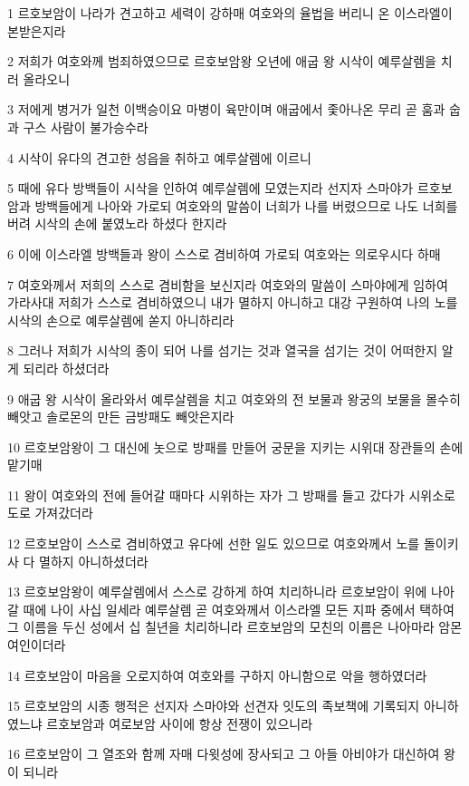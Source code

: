\par 1 르호보암이 나라가 견고하고 세력이 강하매 여호와의 율법을 버리니 온 이스라엘이 본받은지라
\par 2 저희가 여호와께 범죄하였으므로 르호보암왕 오년에 애굽 왕 시삭이 예루살렘을 치러 올라오니
\par 3 저에게 병거가 일천 이백승이요 마병이 육만이며 애굽에서 좇아나온 무리 곧 훔과 숩과 구스 사람이 불가승수라
\par 4 시삭이 유다의 견고한 성읍을 취하고 예루살렘에 이르니
\par 5 때에 유다 방백들이 시삭을 인하여 예루살렘에 모였는지라 선지자 스마야가 르호보암과 방백들에게 나아와 가로되 여호와의 말씀이 너희가 나를 버렸으므로 나도 너희를 버려 시삭의 손에 붙였노라 하셨다 한지라
\par 6 이에 이스라엘 방백들과 왕이 스스로 겸비하여 가로되 여호와는 의로우시다 하매
\par 7 여호와께서 저희의 스스로 겸비함을 보신지라 여호와의 말씀이 스마야에게 임하여 가라사대 저희가 스스로 겸비하였으니 내가 멸하지 아니하고 대강 구원하여 나의 노를 시삭의 손으로 예루살렘에 쏟지 아니하리라
\par 8 그러나 저희가 시삭의 종이 되어 나를 섬기는 것과 열국을 섬기는 것이 어떠한지 알게 되리라 하셨더라
\par 9 애굽 왕 시삭이 올라와서 예루살렘을 치고 여호와의 전 보물과 왕궁의 보물을 몰수히 빼앗고 솔로몬의 만든 금방패도 빼앗은지라
\par 10 르호보암왕이 그 대신에 놋으로 방패를 만들어 궁문을 지키는 시위대 장관들의 손에 맡기매
\par 11 왕이 여호와의 전에 들어갈 때마다 시위하는 자가 그 방패를 들고 갔다가 시위소로 도로 가져갔더라
\par 12 르호보암이 스스로 겸비하였고 유다에 선한 일도 있으므로 여호와께서 노를 돌이키사 다 멸하지 아니하셨더라
\par 13 르호보암왕이 예루살렘에서 스스로 강하게 하여 치리하니라 르호보암이 위에 나아갈 때에 나이 사십 일세라 예루살렘 곧 여호와께서 이스라엘 모든 지파 중에서 택하여 그 이름을 두신 성에서 십 칠년을 치리하니라 르호보암의 모친의 이름은 나아마라 암몬 여인이더라
\par 14 르호보암이 마음을 오로지하여 여호와를 구하지 아니함으로 악을 행하였더라
\par 15 르호보암의 시종 행적은 선지자 스마야와 선견자 잇도의 족보책에 기록되지 아니하였느냐 르호보암과 여로보암 사이에 항상 전쟁이 있으니라
\par 16 르호보암이 그 열조와 함께 자매 다윗성에 장사되고 그 아들 아비야가 대신하여 왕이 되니라

